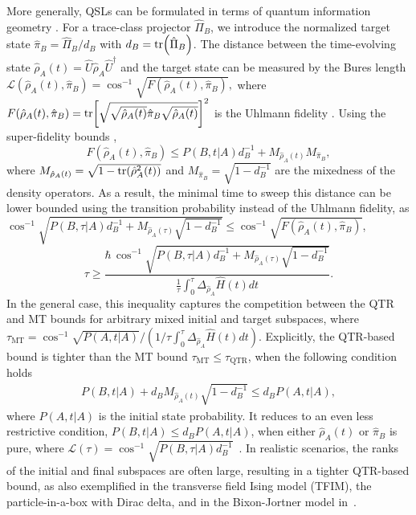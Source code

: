 \documentclass[prl,aps,amssymb,twocolumn,superscriptaddress, notitlepage, longbibliography]{revtex4-2}
\begin{document}
More generally, QSLs can be formulated in terms of quantum information geometry \cite{Amari2000,Bengtsson2017}. For a trace-class projector $\hat{\Pi}_B$, we introduce the normalized target state $\hat{\pi}_B=\hat{\Pi}_B/d_B$ with $d_B=\tr(\hat{\Pi}_B)$. The distance between the time-evolving state $\hat{\rho}_A(t)=\hat{U}\hat{\rho}_A\hat{U}^{\dag}$ and the target state can be measured by the Bures length
$\mathcal{L}(\hat{\rho}_A(t),\hat{\pi}_B)=\cos^{-1}\sqrt{F(\hat{\rho}_A(t),\hat{\pi}_B)},$
where $F(\hat{\rho}_A(t),\hat{\pi}_B)=\tr[\sqrt{\sqrt{\hat\rho_A(t)}\hat\pi_B\sqrt{\hat\rho_A(t)}}]^2$ is the Uhlmann fidelity \cite{Uhlmann1992}. Using the super-fidelity bounds \cite{Liang_FidelityBound_2002,Miszczak2008SubAS},
\begin{equation}
F(\hat{\rho}_A(t),\hat{\pi}_B)\leq P(B,t|A)d^{-1}_B + M_{\hat\rho_A(t)} M_{\hat\pi_B},
\end{equation}
where $M_{\hat\rho_A(t)}=\sqrt{1-\tr(\hat\rho_A^2(t))}$ and $M_{\hat\pi_B}=\sqrt{1-d^{-1}_B}$ are the mixedness of the density operators.
As a result, the minimal time to sweep this distance can be lower bounded using the transition probability instead of the Uhlmann fidelity, as $\cos^{-1}\sqrt{P(B,\tau|A)d^{-1}_B+M_{\hat\rho_A(\tau)}\sqrt{1-d^{-1}_B}}\leq \cos^{-1}\sqrt{F(\hat\rho_A(t),\hat\pi_B)}$,
\begin{equation}\label{eq: QSLQTR}
\tau\geq \frac{\hbar \,\cos^{-1}\sqrt{P(B,\tau|A)d^{-1}_B+M_{\hat\rho_A(\tau)}\sqrt{1-d^{-1}_B}}}{\frac{1}{\tau}\int_0^\tau \Delta_{\hat{\rho}_A} \hat H(t) dt}.
\end{equation}
In the general case, this inequality captures the competition between the QTR and MT bounds for arbitrary mixed initial and target subspaces, where $\tau_\mathrm{MT}=\cos^{-1}\sqrt{P(A,t\vert A)}/\left(1/\tau\int_0^\tau\Delta_{\hat\rho_A}\hat H(t) dt\right)$. Explicitly, the QTR-based bound is tighter than the MT bound $\tau_\mathrm{MT}\leq \tau_\mathrm{QTR}$, when the following condition holds
\begin{eqnarray}\label{eq: P_AB_P_AA}
P(B,t|A) + d_B M_{\hat\rho_A(t)}\sqrt{1-d^{-1}_B} \leq d_B P(A,t|A),\nonumber
\end{eqnarray}
where $P(A,t\vert A)$ is the initial state probability.
It reduces to an even less restrictive condition, $P(B,t\vert A)\leq d_BP(A,t\vert A)$, when either $\hat{\rho}_A(t)$ or $\hat{\pi}_B$ is pure, where
$\mathcal{L}(\tau) = \cos^{-1}\sqrt{P(B,\tau|A)d^{-1}_B}$~\cite{Mandelstam45}.
In realistic scenarios, the ranks of the initial and final subspaces are often large, resulting in a tighter QTR-based bound, as also exemplified in the transverse field Ising model (TFIM), the particle-in-a-box with Dirac delta, and in the Bixon-Jortner model in~\cite{SM}.
\end{document}
